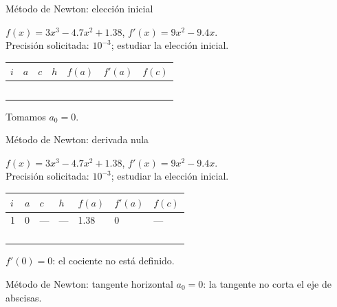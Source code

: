 \documentclass[original_version/main.tex]{subfiles}
\begin{document}
\begin{frame}[t]{Método de Newton: elección inicial}
\begin{minipage}[t][17mm]{\textwidth}\small
$f(x)=3x^3-4.7x^2+1.38$, $f'(x)=9x^2-9.4x$.\\
Precisión solicitada: $10^{-3}$; estudiar la elección inicial.
\end{minipage}\begingroup\scriptsize\setlength{\tabcolsep}{2pt}
\begin{center}\begin{tabular}{|C{.04\textwidth}|*{6}{C{.135\textwidth}|}}\hline
$i$&$a$&$c$&$h$&$f(a)$&$f'(a)$&$f(c)$\\\hline
\rule{0pt}{5mm}&&&&&&\\\hline
\rule{0pt}{5mm}&&&&&&\\\hline
\rule{0pt}{5mm}&&&&&&\\\hline
\rule{0pt}{5mm}&&&&&&\\\hline
\rule{0pt}{5mm}&&&&&&\\\hline
\end{tabular}\end{center}\endgroup\small Tomamos $a_0=0$.
\end{frame}
\begin{frame}[t]{Método de Newton: derivada nula}
\begin{minipage}[t][17mm]{\textwidth}\small
$f(x)=3x^3-4.7x^2+1.38$, $f'(x)=9x^2-9.4x$.\\
Precisión solicitada: $10^{-3}$; estudiar la elección inicial.
\end{minipage}\begingroup\scriptsize\setlength{\tabcolsep}{2pt}
\begin{center}\begin{tabular}{|C{.04\textwidth}|*{6}{C{.135\textwidth}|}}\hline
$i$&$a$&$c$&$h$&$f(a)$&$f'(a)$&$f(c)$\\\hline
\rule{0pt}{5mm}1&0&---&---&1.38&0&---\\\hline
\rule{0pt}{5mm}&&&&&&\\\hline
\rule{0pt}{5mm}&&&&&&\\\hline
\rule{0pt}{5mm}&&&&&&\\\hline
\rule{0pt}{5mm}&&&&&&\\\hline
\end{tabular}\end{center}\endgroup\small $f\prime(0)=0$: el cociente no está definido.
\end{frame}
\begin{frame}[t]{Método de Newton: tangente horizontal}
$a_0=0$: la tangente no corta el eje de abscisas.
\end{frame}
\end{document}
